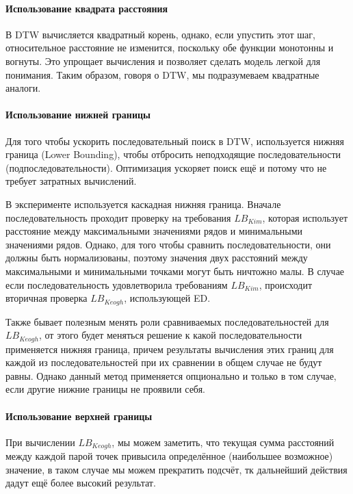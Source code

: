 \documentclass[12pt,twoside]{article}
\begin{document}
        \paragraph{Использование квадрата расстояния}	
        В DTW вычисляется квадратный корень, однако, если упустить этот шаг,
        относительное расстояние не изменится, поскольку обе функции монотонны и вогнуты.
        Это упрощает вычисления и позволяет сделать модель легкой для понимания.
        Таким образом, говоря о DTW, мы подразумеваем квадратные аналоги.
        
        \paragraph{Использование нижней границы}
        Для того чтобы ускорить последовательный поиск в DTW, используется нижняя граница (Lower Bounding),
        чтобы отбросить неподходящие последовательности (подпоследовательности).
        Оптимизация ускоряет поиск ещё и потому что не требует затратных вычислений.
        
        В эксперименте используется каскадная нижняя граница.
        Вначале последовательность проходит проверку на требования $LB_{Kim}$,
        которая использует расстояние между максимальными значениями рядов и минимальными значениями рядов.
        Однако, для того чтобы сравнить последовательности, они должны быть нормализованы,
        поэтому значения двух расстояний между максимальными и минимальными точками могут быть ничтожно малы.
        В случае если последовательность удовлетворила требованиям $LB_{Kim}$, происходит вторичная проверка $LB_{Keogh}$, использующей ED.
        
        Также бывает полезным менять роли сравниваемых последовательностей для $LB_{Keogh}$,
        от этого будет меняться решение к какой последовательности применяется нижняя граница,
        причем результаты вычисления этих границ для каждой из последовательностей при их сравнении в общем случае не будут равны.
        Однако данный метод применяется опционально и только в том случае, если другие нижние границы не проявили себя.
        
        \paragraph{Использование верхней границы}
        При вычислении $LB_{Keogh}$, мы можем заметить,
        что текущая сумма расстояний между каждой парой точек привысила определённое (наибольшее возможное) значение,
        в таком случае мы можем прекратить подсчёт, тк дальнейший действия дадут ещё более высокий результат.
        
\end{document}
